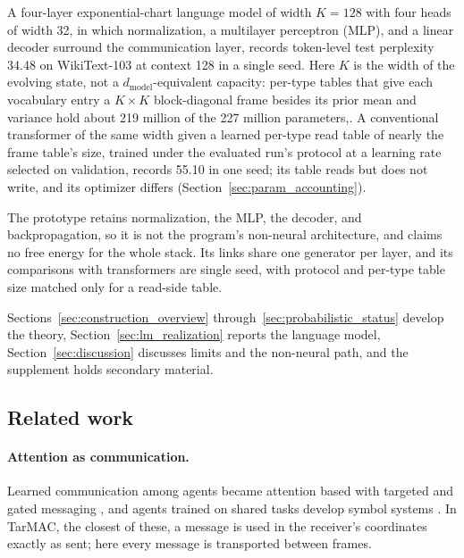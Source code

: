 \documentclass[twoside,11pt]{article}
\begin{document}
A four-layer exponential-chart language model of width $K=128$ with four heads of width 32, in which normalization, a multilayer perceptron (MLP), and a linear decoder surround the communication layer, records token-level test perplexity 34.48 on WikiText-103 at context 128 in a single seed. Here $K$ is the width of the evolving state, not a $d_{\mathrm{model}}$-equivalent capacity: per-type tables that give each vocabulary entry a $K\times K$ block-diagonal frame besides its prior mean and variance hold about 219 million of the 227 million parameters,. A conventional transformer of the same width given a learned per-type read table of nearly the frame table's size, trained under the evaluated run's protocol at a learning rate selected on validation, records 55.10 in one seed; its table reads but does not write, and its optimizer differs (Section~\ref{sec:param_accounting}).

The prototype retains normalization, the MLP, the decoder, and backpropagation, so it is not the program's non-neural architecture, and claims no free energy for the whole stack. Its links share one generator per layer, and its comparisons with transformers are single seed, with protocol and per-type table size matched only for a read-side table.

Sections~\ref{sec:construction_overview} through~\ref{sec:probabilistic_status} develop the theory, Section~\ref{sec:lm_realization} reports the language model, Section~\ref{sec:discussion} discusses limits and the non-neural path, and the supplement holds secondary material.

\subsection{Related work}
\label{sec:related_work}

\paragraph{Attention as communication.} Learned communication among agents \citep{foerster2016learning,Sukhbaatar2016CommNet} became attention based with targeted and gated messaging \citep{Jiang2018ATOC,Das2019TarMAC}, and agents trained on shared tasks develop symbol systems \citep{Lazaridou2017Emergence,Mordatch2018Grounded,Lazaridou2020EmergentCommunication}. In TarMAC, the closest of these, a message is used in the receiver's coordinates exactly as sent; here every message is transported between frames.
\end{document}

